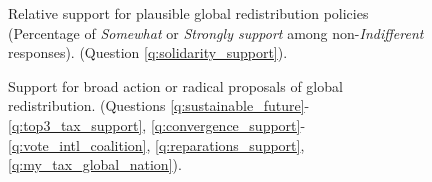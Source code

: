 \documentclass[12pt,english]{article}
\begin{document}
\begin{bibunit}
\begin{figure}[h!]
    \caption[Relative support for plausible global redistribution policies]{Relative support for plausible global redistribution policies (Percentage of \textit{Somewhat} or \textit{Strongly support} among non-\textit{Indifferent} responses). (Question \ref{q:solidarity_support}).
    }\label{fig:solidarity_support_share}
\end{figure}
\begin{figure}[h!]
    \caption[Support for broad or radical global redistribution]{Support for broad action or radical proposals of global redistribution. \hfill (Questions \ref{q:sustainable_future}-\ref{q:top3_tax_support}, \ref{q:convergence_support}-\ref{q:vote_intl_coalition}, \ref{q:reparations_support}, \ref{q:my_tax_global_nation}).
    }\label{fig:radical_redistr_share} 

\end{figure}
\end{bibunit}
\end{document}
